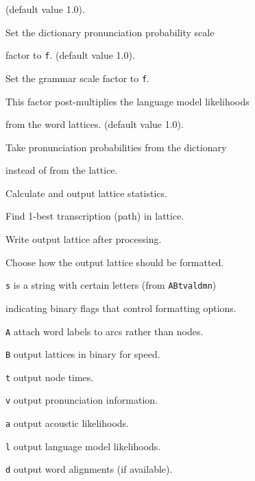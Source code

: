 \begin{optlist}
  (default value 1.0).





   Set the dictionary pronunciation probability scale 


        factor to \texttt{f}. (default value 1.0).





   Set the grammar scale factor to \texttt{f}.


        This factor post-multiplies the language model likelihoods


        from the word lattices.  (default value 1.0).





   Take pronunciation probabilities from the dictionary


  instead of from the lattice.





   Calculate and output lattice statistics.





   Find 1-best transcription (path) in lattice.





   Write output lattice after processing.





   Choose how the output lattice should be formatted.


         \texttt{s} is a string with certain letters (from \texttt{ABtvaldmn})


         indicating binary flags that control formatting options.


         \texttt{A} attach word labels to arcs rather than nodes.


         \texttt{B} output lattices in binary for speed.


         \texttt{t} output node times.


         \texttt{v} output pronunciation information.


         \texttt{a} output acoustic likelihoods.


         \texttt{l} output language model likelihoods.


         \texttt{d} output word alignments (if available).



\end{optlist}
